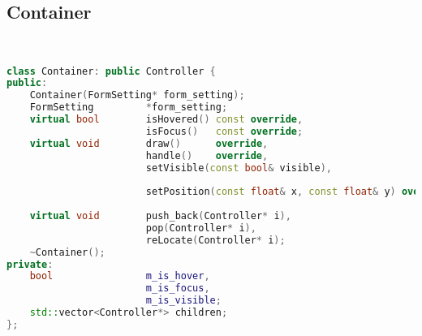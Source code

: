 \subsection{Container}
\begin{lstlisting}[language=C++]


class Container: public Controller {
public:
    Container(FormSetting* form_setting);
    FormSetting         *form_setting;
    virtual bool        isHovered() const override,
                        isFocus()   const override;
    virtual void        draw()      override,
                        handle()    override,
                        setVisible(const bool& visible),
                            
                        setPosition(const float& x, const float& y) override;
    
    virtual void        push_back(Controller* i),
                        pop(Controller* i),
                        reLocate(Controller* i);
    ~Container();
private:
    bool                m_is_hover,
                        m_is_focus,
                        m_is_visible;
    std::vector<Controller*> children;
};






\end{lstlisting}
